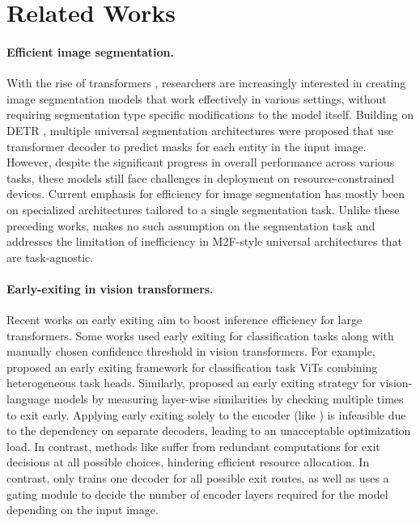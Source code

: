 \section{Related Works}
\label{sec:related_works}
%
\paragraph{Efficient image segmentation.} With the rise of transformers \cite{vaswani2017attention}, researchers are increasingly interested in creating image segmentation models that work effectively in various settings, without requiring segmentation type specific modifications to the model itself. Building on DETR \cite{carion2020end}, multiple universal segmentation architectures were proposed \cite{cheng2021per,cheng2021mask2former, jain2023oneformer, gu2024dataseg} that use transformer decoder to predict masks for each entity in the input image. However, despite the significant progress in overall performance across various tasks, these models still face challenges in deployment on resource-constrained devices. Current emphasis \cite{cheng2020panoptic, fan2021rethinking, hou2020real, hu2023you, 10296714, xu2023pidnet, yu2018bisenet, yu2021bisenet} for efficiency for image segmentation has mostly been on specialized architectures tailored to a single segmentation task. Unlike these preceding works, \ours makes no such assumption on the segmentation task and addresses the limitation of inefficiency in M2F-style universal architectures that are task-agnostic.
%
\paragraph{Early-exiting in vision transformers.} Recent works on early exiting \cite{wan2023efficient, xu2024survey, tang2023you, xu2023lgvit, liu2021mevt, wang2022single, jiang2023multi, yang2023exploiting, valade2024eero, tang2023need, zhang2023adaptive} aim to boost inference efficiency for large transformers. Some works \cite{xu2023lgvit, liu2021mevt, tang2023you} used early exiting for classification tasks along with manually chosen confidence threshold in vision transformers. For example, \cite{xu2023lgvit} proposed an early exiting framework for classification task ViTs combining heterogeneous task heads. Similarly, \cite{tang2023you} proposed an early exiting strategy for vision-language models by measuring layer-wise similarities by checking multiple times to exit early.  Applying early exiting solely to the encoder (like \cite{xu2023lgvit}) is infeasible due to the dependency on separate decoders, leading to an unacceptable optimization load. In contrast, methods like \cite{tang2023you} suffer from redundant computations for exit decisions at all possible choices, hindering efficient resource allocation. In contrast, \ours only trains one decoder for all possible exit routes, as well as uses a gating module to decide the number of encoder layers required for the model depending on the input image. 